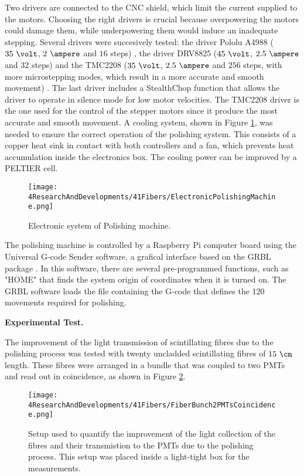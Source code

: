 \begin{enumerate}
Two drivers are connected to the CNC shield, which limit the current supplied to the motors. Choosing the right drivers is crucial because overpowering the motors could damage them, while underpowering them would induce an inadequate stepping. Several drivers were succesively tested: the driver Pololu A4988 ($35~\volt$, $2~\ampere$ and $16$ steps) \cite{A4988Driver}, the driver DRV8825 ($45~\volt$, $2.5~\ampere$ and $32$ steps) \cite{DRV8825Driver} and the TMC2208 ($35~\volt$, $2.5~\ampere$ and $256$ steps, with more microstepping modes, which result in a more accurate and smooth movement) \cite{TMC2208Driver}. The last driver includes a StealthChop function that allows the driver to operate in silence mode for low motor velocities. The TMC2208 driver is the one used for the control of the stepper motors since it produce the most accurate and smooth movement. A cooling system, shown in Figure \ref{fig:ElectronicSystemPolishingMachine}, was needed to ensure the correct operation of the polishing system. This consists of a copper heat sink in contact with both controllers and a fan, which prevents heat accumulation inside the electronics box. The cooling power can be improved by a PELTIER cell.

\begin{figure}[h]
\centering
\texttt{[image: 4ResearchAndDevelopments/41Fibers/ElectronicPolishingMachine.png]}
\caption{Electronic system of Polishing machine.\label{fig:ElectronicSystemPolishingMachine}}
\end{figure}
\end{enumerate}

The polishing machine is controlled by a Raspberry Pi computer board \cite{RaspberryPi} using the Universal G-code Sender software, a grafical interface based on the GRBL package \cite{GRBLDocumentation}. In this software, there are several pre-programmed functions, such as "HOME" that finds the system origin of coordinates when it is turned on. The GRBL software loads the file containing the G-code that defines the 120 movements required for polishing.

\textbf{Experimental Test.}

The improvement of the light transmission of scintillating fibres due to the polishing process was tested with twenty uncladded scintillating fibres of $15~\cm$ length. These fibres were arranged in a bundle that was coupled to two PMTs and read out in coincidence, as shown in Figure \ref{fig:BunchWith2PMTsCoincidence}.

\begin{figure}[]
\centering
\texttt{[image: 4ResearchAndDevelopments/41Fibers/FiberBunch2PMTsCoincidence.png]}
\caption{Setup used to quantify the improvement of the light collection of the fibres and their transmistion to the PMTs due to the polishing process. This setup was placed inside a light-tight box for the measurements.\label{fig:BunchWith2PMTsCoincidence}}
\end{figure}

